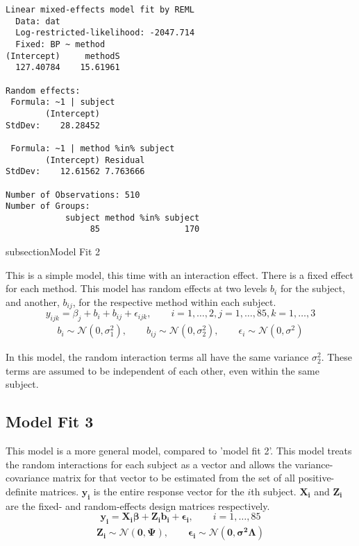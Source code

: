 \documentclass[Chap4cmain.tex]{subfiles}
\begin{document}
\begin{verbatim}
Linear mixed-effects model fit by REML
  Data: dat
  Log-restricted-likelihood: -2047.714
  Fixed: BP ~ method
(Intercept)     methodS
  127.40784    15.61961

Random effects:
 Formula: ~1 | subject
        (Intercept)
StdDev:    28.28452

 Formula: ~1 | method %in% subject
        (Intercept) Residual
StdDev:    12.61562 7.763666

Number of Observations: 510
Number of Groups:
            subject method %in% subject
                 85                 170
\end{verbatim}

subsection{Model Fit 2}


This is a simple model, this time with an interaction effect.
There is a fixed effect for each method. This model has random effects at two levels $b_{i}$ for the subject, and
another, $b_{ij}$, for the respective method within each subject.
\begin{equation*}
y_{ijk} = \beta_{j}  + b_{i} + b_{ij} + \epsilon_{ijk}, \qquad i=1,\dots,2, j=1,\dots,85, k=1,\dots,3
\end{equation*}
\begin{eqnarray*}
b_{i} \sim \mathcal{N}(0,\sigma^2_{1}), \qquad b_{ij} \sim \mathcal{N}(0,\sigma^2_{2}), \qquad \epsilon_{i} \sim \mathcal{N}(0,\sigma^2)
\end{eqnarray*}

In this model, the random interaction terms all have the same variance $\sigma^2_{2}$. These terms are assumed to be independent of each other, even
within the same subject.


\newpage
\subsection{Model Fit 3}

This model is a more general model, compared to 'model fit 2'. This model treats the random interactions for each subject as a vector and
allows the variance-covariance matrix for that vector to be estimated from the set of all positive-definite matrices.
$\boldsymbol{y_{i}}$ is the entire response vector for the $i$th subject.
$\boldsymbol{X_{i}}$ and $\boldsymbol{Z_{i}}$  are the fixed- and random-effects design matrices respectively.
\begin{equation*}
\boldsymbol{y_{i}} = \boldsymbol{X_{i}\beta}  + \boldsymbol{Z_{i}b_{i}} + \boldsymbol{\epsilon_{i}}, \qquad i=1,\dots,85
\end{equation*}
\begin{eqnarray*}
\boldsymbol{Z_{i}} \sim \mathcal{N}(\boldsymbol{0,\Psi}),\qquad
\boldsymbol{\epsilon_{i}} \sim \mathcal{N}(\boldsymbol{0,\sigma^2\Lambda})
\end{eqnarray*}
\end{document}
